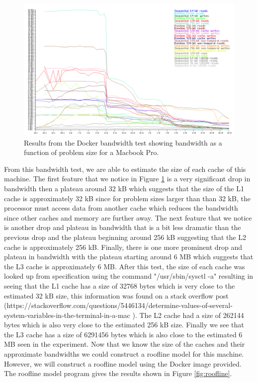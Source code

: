 \documentclass{article}
\begin{document}
\begin{figure}[H]
	\centering
	\label{fig:bandwidth}
	\includegraphics[width=0.6 \textwidth]{./bandwidth.png}	
	\caption{Results from the Docker bandwidth test showing bandwidth as a function of problem size for a Macbook Pro.}
\end{figure}

From this bandwidth test, we are able to estimate the size of each cache of this machine. The first feature that we notice in Figure \ref{fig:bandwidth} is a very significant drop in bandwidth then a plateau around 32 kB which suggests that the size of the L1 cache is approximately 32 kB since for problem sizes larger than than 32 kB, the processor must access data from another cache which reduces the bandwidth since other caches and memory are further away. The next feature that we notice is another drop and plateau in bandwidth that is a bit less dramatic than the previous drop and the plateau beginning around 256 kB suggesting that the L2 cache is approximately 256 kB. Finally, there is one more prominent drop and plateau in bandwidth with the plateau starting around 6 MB which suggests that the L3 cache is approximately 6 MB. After this test, the size of each cache was looked up from specification using the command "/usr/sbin/sysctl -a" resulting in seeing that the L1 cache has a size of 32768 bytes which is very close to the estimated 32 kB size, this information was found on a stack overflow post (https://stackoverflow.com/questions/5446134/determine-values-of-several-system-variables-in-the-terminal-in-a-mac
). The L2 cache had a size of 262144 bytes which is also very close to the estimated 256 kB size. Finally we see that the L3 cache has a size of 6291456 bytes which is also close to the estimated 6 MB seen in the experiment. Now that we know the size of the caches and their approximate bandwidths we could construct a roofline model for this machine. However, we will construct a roofline model using the Docker image provided. The roofline model program gives the results shown in Figure \ref{fig:roofline}. 
\end{document}
